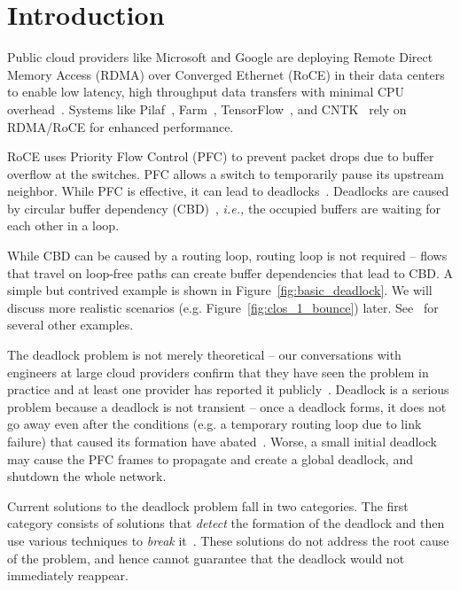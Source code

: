 \section{Introduction}
\label{sec:intro}

Public cloud providers like Microsoft and Google are deploying Remote Direct
Memory Access (RDMA) over Converged Ethernet (RoCE) in their data centers to enable low
latency, high throughput data transfers with minimal CPU
overhead~\cite{dcqcn,timely}. Systems like Pilaf~\cite{pilaf}, Farm~\cite{farm},
TensorFlow~\cite{tensorflow}, and CNTK~\cite{cntk} rely on RDMA/RoCE for
enhanced performance.

RoCE uses Priority Flow Control (PFC) to prevent packet drops due to buffer
overflow at the switches. PFC allows a switch to temporarily pause its upstream
neighbor. While PFC is effective, it can lead to
deadlocks~\cite{rdmaatscale,tcpbolt,hu2016deadlocks}. Deadlocks are caused by
circular buffer dependency (CBD)~\cite{hu2016deadlocks}, {\em i.e.,} the occupied
buffers are waiting for each other in a loop.

While CBD can be caused by a routing loop, routing loop is not required -- flows
that travel on loop-free paths can create buffer dependencies that lead to CBD.
A simple but contrived example is shown in Figure~\ref{fig:basic_deadlock}. We
will discuss more realistic scenarios (e.g. Figure~\ref{fig:clos_1_bounce})
later.  See~\cite{hu2016deadlocks} for several other examples.

The deadlock problem is not merely theoretical -- our conversations with
engineers at large cloud providers confirm that they have seen the problem in
practice and at least one provider has reported it publicly~\cite{rdmaatscale}.
Deadlock is a serious problem because a deadlock is not transient -- once a
deadlock forms, it does not go away even after the conditions (e.g. a temporary
routing loop due to link failure) that caused its formation have
abated~\cite{rdmaatscale}. Worse, a small initial deadlock may cause the PFC
frames to propagate and create a global deadlock, and shutdown the whole
network.

Current solutions to the deadlock problem fall in two categories. The first
category consists of solutions that {\em detect} the formation of the deadlock
and then use various techniques to {\em break} it~\cite{shpiner2016unlocking}.
These solutions do not address the root cause of the problem, and hence cannot
guarantee that the deadlock would not immediately reappear.


